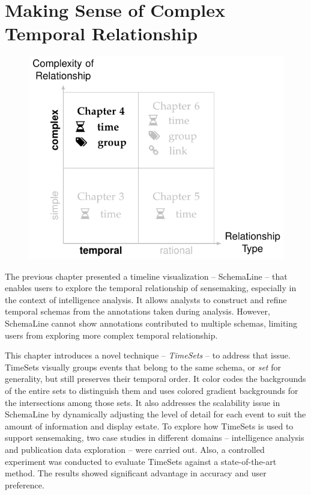 \chapter{Making Sense of Complex Temporal Relationship}
\label{chap:timesets}

\graphicspath{{Chapter4/figures/}}

\begin{figure}[!htb]
	\centering
	\includegraphics{work}
\end{figure}

\vspace{1in}


\pagebreak

The previous chapter presented a timeline visualization -- SchemaLine -- that enables users to explore the temporal relationship of sensemaking, especially in the context of intelligence analysis. It allows analysts to construct and refine temporal schemas from the annotations taken during analysis. However, SchemaLine cannot show annotations contributed to multiple schemas, limiting users from exploring more complex temporal relationship. 

This chapter introduces a novel technique -- \emph{TimeSets} -- to address that issue. TimeSets visually groups events that belong to the same schema, or \emph{set} for generality, but still preserves their temporal order. It color codes the backgrounds of the entire sets to distinguish them and uses colored gradient backgrounds for the intersections among those sets. It also addresses the scalability issue in SchemaLine by dynamically adjusting the level of detail for each event to suit the amount of information and display estate. To explore how TimeSets is used to support sensemaking, two case studies in different domains -- intelligence analysis and publication data exploration -- were carried out. Also, a controlled experiment was conducted to evaluate TimeSets against a state-of-the-art method. The results showed significant advantage in accuracy and user preference.

